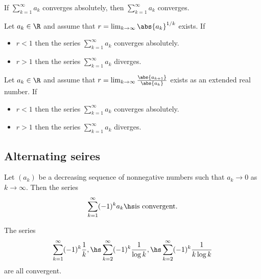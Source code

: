 \documentclass{article}
\begin{document}
\begin{theorem}
    If $\sum_{k=1}^\infty a_k$ converges absolutely, then $\sum_{k=1}^\infty a_k$
    converges.
\end{theorem}

\begin{theorem}
    Let $a_k\in\R$ and assume that $r=\lim_{k\to\infty} \abs{a_k}^{1/k}$
    exists. If
    \begin{itemize}
        \item $r<1$ then the series $\sum_{k=1}^\infty a_k$ converges absolutely.
        \item $r>1$ then the series $\sum_{k=1}^\infty a_k$ diverges.
    \end{itemize}
\end{theorem}

\setcounter{theorem}{4}
\begin{theorem}
    Let $a_k\in\R$ and assume that $r=\lim_{k\to\infty}\frac{\abs{a_{k+1}}}{\abs{a_k}}$
    exists as an extended real number. If
    \begin{itemize}
        \item $r<1$ then the series $\sum_{k=1}^\infty a_k$ converges absolutely.
        \item $r>1$ then the series $\sum_{k=1}^\infty a_k$ diverges.
    \end{itemize}
\end{theorem}

\subsection{Alternating seires}

\begin{theorem}
    Let $(a_k)$ be a decreasing sequence of nonnegative numbers such that
    $a_k\to 0$ as $k\to\infty$. Then the series
    \begin{align*}
        \sum_{k=1}^\infty (-1)^k a_k\hs\text{is convergent}.
    \end{align*}
\end{theorem}

\begin{corollary}
    The series
    \begin{align*}
        \sum_{k=1}^\infty (-1)^k\frac{1}{k},\hs \sum_{k=2}^\infty (-1)^k\frac{1}{\log k},
        \hs \sum_{k=2}^\infty (-1)^k\frac{1}{k\log k}
    \end{align*}
    are all convergent.
\end{corollary}
\end{document}

